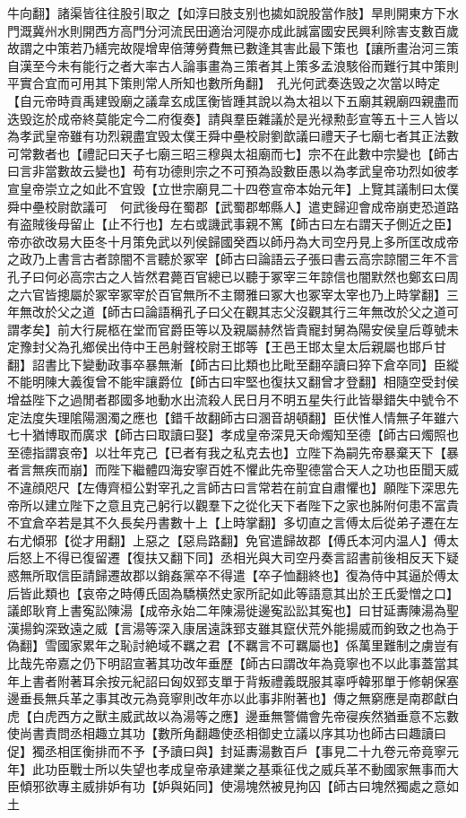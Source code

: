 牛向翻】諸渠皆往往股引取之【如淳曰肢支别也㨿如說股當作肢】旱則開東方下水門溉冀州水則開西方高門分河流民田適治河隄亦成此誠富國安民興利除害支數百歲故謂之中策若乃繕完故隄增卑倍薄勞費無已數逢其害此最下策也【讓所畫治河三策自漢至今未有能行之者大率古人論事畫為三策者其上策多孟浪駭俗而難行其中策則平實合宜而可用其下策則常人所知也數所角翻】　孔光何武奏迭毁之次當以時定【自元帝時貢禹建毁廟之議韋玄成匡衡皆踵其說以為太祖以下五廟其親廟四親盡而迭毁迄於成帝終莫能定今二府復奏】請與羣臣雜議於是光禄勲彭宣等五十三人皆以為孝武皇帝雖有功烈親盡宜毁太僕王舜中壘校尉劉歆議曰禮天子七廟七者其正法數可常數者也【禮記曰天子七廟三昭三穆與太祖廟而七】宗不在此數中宗變也【師古曰言非當數故云變也】苟有功德則宗之不可預為設數臣愚以為孝武皇帝功烈如彼孝宣皇帝崇立之如此不宜毁【立世宗廟見二十四卷宣帝本始元年】上覽其議制曰太僕舜中壘校尉歆議可　何武後母在蜀郡【武蜀郡郫縣人】遣吏歸迎會成帝崩吏恐道路有盗賊後母留止【止不行也】左右或譏武事親不篤【師古曰左右謂天子側近之臣】帝亦欲改易大臣冬十月策免武以列侯歸國癸酉以師丹為大司空丹見上多所匡改成帝之政乃上書言古者諒闇不言聽於冢宰【師古曰論語云子張曰書云高宗諒闇三年不言孔子曰何必高宗古之人皆然君薨百官總已以聽于冢宰三年諒信也闇默然也鄭玄曰周之六官皆摠屬於冢宰冢宰於百官無所不主爾雅曰冢大也冢宰太宰也乃上時掌翻】三年無改於父之道【師古曰論語稱孔子曰父在觀其志父沒觀其行三年無改於父之道可謂孝矣】前大行屍柩在堂而官爵臣等以及親屬赫然皆貴寵封舅為陽安侯皇后尊號未定豫封父為孔鄉侯出侍中王邑射聲校尉王邯等【王邑王邯太皇太后親屬也邯戶甘翻】詔書比下變動政事卒暴無漸【師古曰比類也比毗至翻卒讀曰猝下倉卒同】臣縱不能明陳大義復曾不能牢讓爵位【師古曰牢堅也復扶又翻曾才登翻】相隨空受封侯增益陛下之過閒者郡國多地動水出流殺人民日月不明五星失行此皆舉錯失中號令不定法度失理隂陽溷濁之應也【錯千故翻師古曰溷音胡頓翻】臣伏惟人情無子年雖六七十猶博取而廣求【師古曰取讀曰娶】孝成皇帝深見天命燭知至德【師古曰燭照也至德指謂哀帝】以壮年克己【已者有我之私克去也】立陛下為嗣先帝暴棄天下【暴者言無疾而崩】而陛下繼體四海安寧百姓不懼此先帝聖德當合天人之功也臣聞天威不違顔咫尺【左傳齊桓公對宰孔之言師古曰言常若在前宜自肅懼也】願陛下深思先帝所以建立陛下之意且克己躬行以觀羣下之從化天下者陛下之家也胏附何患不富貴不宜倉卒若是其不久長矣丹書數十上【上時掌翻】多切直之言傅太后從弟子遷在左右尤傾邪【從才用翻】上惡之【惡烏路翻】免官遣歸故郡【傅氏本河内温人】傅太后怒上不得已復留遷【復扶又翻下同】丞相光與大司空丹奏言詔書前後相反天下疑惑無所取信臣請歸遷故郡以銷姦黨卒不得遣【卒子恤翻終也】復為侍中其逼於傅太后皆此類也【哀帝之時傅氏固為驕横然史家所記如此等語意其出於王氏愛憎之口】　議郎耿育上書寃訟陳湯【成帝永始二年陳湯徙邊寃訟訟其寃也】曰甘延夀陳湯為聖漢揚鈎深致遠之威【言湯等深入康居遠誅郅支雖其竄伏荒外能揚威而鉤致之也為于偽翻】雪國家累年之恥討絶域不羈之君【不羈言不可羈屬也】係萬里難制之虜豈有比哉先帝嘉之仍下明詔宣著其功改年垂歷【師古曰謂改年為竟寧也不以此事蓋當其年上書者附著耳余按元紀詔曰匈奴郅支單于背叛禮義既服其辜呼韓邪單于修朝保塞邊垂長無兵革之事其改元為竟寧則改年亦以此事非附著也】傳之無窮應是南郡獻白虎【白虎西方之獸主威武故以為湯等之應】邊垂無警備會先帝寑疾然猶垂意不忘數使尚書責問丞相趣立其功【數所角翻趣使丞相御史立議以序其功也師古曰趣讀曰促】獨丞相匡衡排而不予【予讀曰與】封延夀湯數百戶【事見二十九卷元帝竟寧元年】此功臣戰士所以失望也孝成皇帝承建業之基乘征伐之威兵革不動國家無事而大臣傾邪欲專主威排妒有功【妒與妬同】使湯塊然被見拘囚【師古曰塊然獨處之意如土